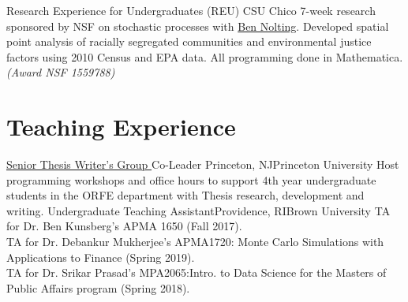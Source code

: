 \documentclass[10pt,a4paper,roman]{moderncv}        %
\begin{document}
{Research Experience for Undergraduates (REU)}
{CSU Chico}{}
{7-week research sponsored by NSF on stochastic processes with
  \href{http://www.bennolting.org}{Ben Nolting}.
  Developed spatial point analysis of racially segregated communities
  and environmental justice factors using 2010 Census and EPA data.
  All programming done in Mathematica. \textit{(Award NSF 1559788)}}

\section{Teaching Experience}
{\color{blue}\href{https://orfe.princeton.edu/undergraduate/stwg}{Senior Thesis
    Writer's Group }\color{black} Co-Leader}
{Princeton, NJ}{Princeton University}
{Host programming workshops and office hours to support
  4th year undergraduate students in the ORFE department with Thesis research, development and writing.}
{Undergraduate Teaching Assistant}{Providence, RI}{Brown University}
{TA for Dr. Ben Kunsberg's APMA 1650 (Fall 2017).\\
TA for Dr. Debankur Mukherjee's APMA1720: Monte Carlo Simulations with Applications to Finance (Spring 2019). \\
TA for Dr. Srikar Prasad's MPA2065:Intro. to Data Science for the Masters of Public Affairs program (Spring 2018).}
\end{document}
